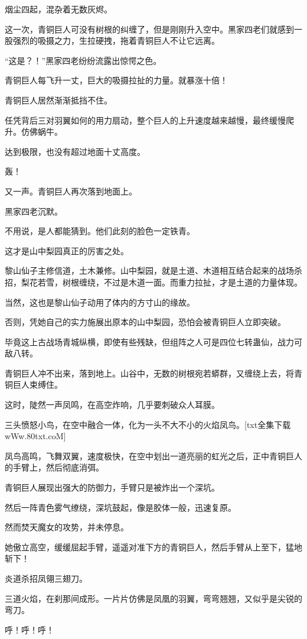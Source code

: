 \begin{this_body}
烟尘四起，混杂着无数灰烬。

这一次，青铜巨人可没有树根的纠缠了，但是刚刚升入空中。黑家四老们就感到一股强烈的吸摄之力，生拉硬拽，拖着青铜巨人不让它远离。

“这是？！”黑家四老纷纷流露出惊愕之色。

青铜巨人每飞升一丈，巨大的吸摄拉扯的力量。就暴涨十倍！

青铜巨人居然渐渐抵挡不住。

任凭背后三对羽翼如何的用力扇动，整个巨人的上升速度越来越慢，最终缓慢爬升。仿佛蜗牛。

达到极限，也没有超过地面十丈高度。

轰！

又一声。青铜巨人再次落到地面上。

黑家四老沉默。

不用说，是人都能猜到。他们此刻的脸色一定铁青。

这才是山中梨园真正的厉害之处。

黎山仙子主修信道，土木兼修。山中梨园，就是土道、木道相互结合起来的战场杀招，梨花若雪，树根缠绕，不过是木道一面。而重力拉扯，才是土道的力量体现。

当然，这也是黎山仙子动用了体内的方寸山的缘故。

否则，凭她自己的实力施展出原本的山中梨园，恐怕会被青铜巨人立即突破。

毕竟这上古战场青城纵横，即使有些残缺，但组阵之人可是四位七转蛊仙，战力可敌八转。

青铜巨人冲不出来，落到地上。山谷中，无数的树根宛若蟒群，又缠绕上去，将青铜巨人束缚住。

这时，陡然一声凤鸣，在高空炸响，几乎要刺破众人耳膜。

三头愤怒小鸟，在空中融合一体，化为一头不大不小的火焰凤鸟。[txt全集下载wWw.80txt.coM]

凤鸟高鸣，飞舞双翼，速度极快，在空中划出一道亮丽的虹光之后，正中青铜巨人的手臂上，然后彻底消弭。

青铜巨人展现出强大的防御力，手臂只是被炸出一个深坑。

然后一阵青色雾气缭绕，深坑鼓起，像是胶体一般，迅速复原。

然而焚天魔女的攻势，并未停息。

她傲立高空，缓缓屈起手臂，遥遥对准下方的青铜巨人，然后手臂从上至下，猛地斩下！

炎道杀招凤翎三翅刀。

三道火焰，在刹那间成形。一片片仿佛是凤凰的羽翼，弯弯翘翘，又似乎是尖锐的弯刀。

呼！呼！呼！


\end{this_body}
